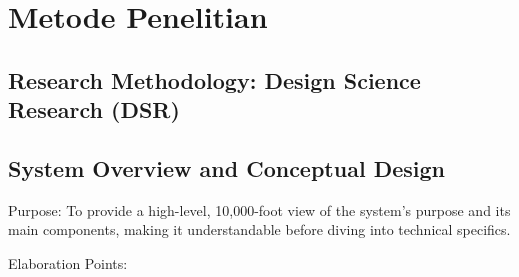 \chapter{Metode Penelitian}


\section{Research Methodology: Design Science Research (DSR)}












\section{System Overview and Conceptual Design}

Purpose: To provide a high-level, 10,000-foot view of the system's purpose and its main components, making it understandable before diving into technical specifics.

Elaboration Points:

